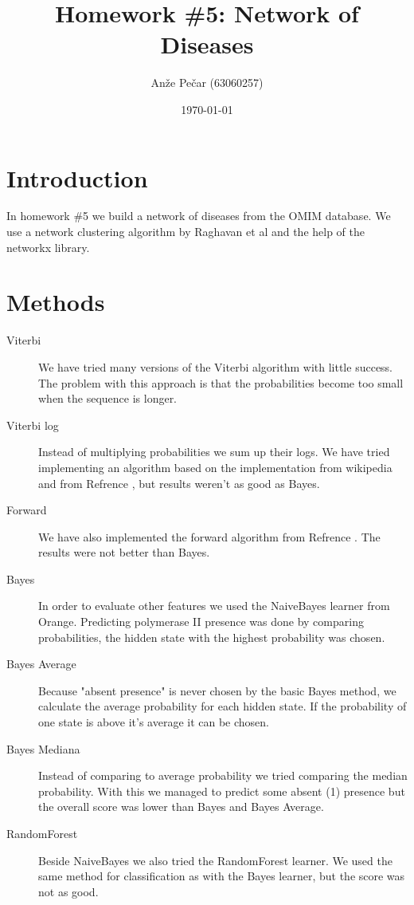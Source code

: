 \documentclass[a4paper,11pt]{article}
\title{Homework \#5: Network of Diseases}
\author{Anže Pečar (63060257)}
\date{\today}
\begin{document}
\maketitle

\section{Introduction}

In homework \#5 we build a network of diseases from the OMIM database. We use a network clustering algorithm by Raghavan et al and the help of the networkx library.
\section{Methods}

\begin{description}
    \item[Viterbi] We have tried many versions of the Viterbi algorithm with little success. The problem with this approach is that the probabilities become too small when the sequence is longer.
    	\item[Viterbi log] Instead of multiplying probabilities we sum up their logs. We have tried implementing an algorithm based on the implementation from wikipedia and from Refrence \cite{icg}, but results weren't as good as Bayes.
    	\item[Forward] We have also implemented the forward algorithm from Refrence \cite{icg}. The results were not better than Bayes.
    	\item[Bayes] In order to evaluate other features we used the NaiveBayes learner from Orange. Predicting polymerase II presence was done by comparing probabilities, the hidden state with the highest probability was chosen.
    	\item[Bayes Average] Because "absent presence" is never chosen by the basic Bayes method, we calculate the average probability for each hidden state. If the probability of one state is above it's average it can be chosen.   
    	\item[Bayes Mediana] Instead of comparing to average probability we tried comparing the median probability. With this we managed to predict some absent (1) presence but the overall score was lower than Bayes and Bayes Average.
    	\item[RandomForest] Beside NaiveBayes we also tried the RandomForest learner. We used the same method for classification as with the Bayes learner, but the score was not as good.
\end{description}
\end{document}
